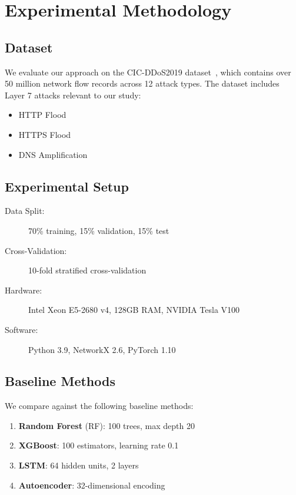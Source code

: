 \documentclass[preprint,12pt]{elsarticle}
\begin{document}
\section{Experimental Methodology}
\label{sec:experiments}

\subsection{Dataset}

We evaluate our approach on the CIC-DDoS2019 dataset~\cite{sharafaldin2019cic}, which contains over 50 million network flow records across 12 attack types. The dataset includes Layer 7 attacks relevant to our study:

\begin{itemize}
    \item HTTP Flood
    \item HTTPS Flood
    \item DNS Amplification
\end{itemize}

\subsection{Experimental Setup}

\begin{description}
    \item[Data Split:] 70\% training, 15\% validation, 15\% test
    \item[Cross-Validation:] 10-fold stratified cross-validation
    \item[Hardware:] Intel Xeon E5-2680 v4, 128GB RAM, NVIDIA Tesla V100
    \item[Software:] Python 3.9, NetworkX 2.6, PyTorch 1.10
\end{description}

\subsection{Baseline Methods}

We compare against the following baseline methods:

\begin{enumerate}
    \item \textbf{Random Forest} (RF): 100 trees, max depth 20
    \item \textbf{XGBoost}: 100 estimators, learning rate 0.1
    \item \textbf{LSTM}: 64 hidden units, 2 layers
    \item \textbf{Autoencoder}: 32-dimensional encoding
\end{enumerate}
\end{document}
